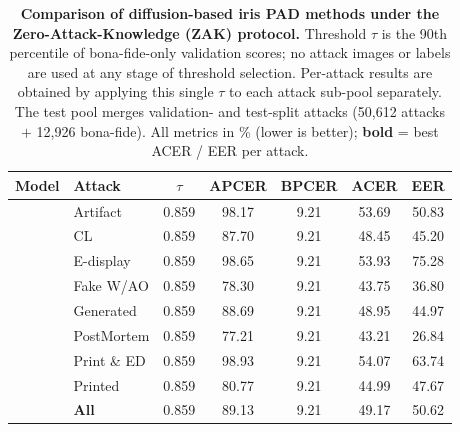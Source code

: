 \begin{table}[!htbp]
\centering
\scriptsize
\setlength{\tabcolsep}{3pt}
\label{tab:diffusion_comparison}
\caption{
\textbf{Comparison of diffusion-based iris PAD methods under the Zero-Attack-Knowledge (ZAK) protocol.}
Threshold $\tau$ is the 90th percentile of bona-fide-only validation scores; no attack images or labels are used at any stage of threshold selection.
Per-attack results are obtained by applying this single $\tau$ to each attack sub-pool separately.
The test pool merges validation- and test-split attacks (50{,}612 attacks $+$ 12{,}926 bona-fide).
All metrics in \% (lower is better); \textbf{bold} = best ACER / EER per attack.
}

\begin{tabular}{l l c c c c c}
\toprule
\textbf{Model} & \textbf{Attack} & $\tau$ & APCER & BPCER & ACER & EER \\
\midrule

& Artifact       & 0.859 &  98.17 &   9.21 &                53.69 &          50.83 \\
& CL             & 0.859 &  87.70 &   9.21 &                48.45 &          45.20 \\
& E-display      & 0.859 &  98.65 &   9.21 &                53.93 &          75.28 \\
& Fake W/AO      & 0.859 &  78.30 &   9.21 &                43.75 &          36.80 \\
& Generated      & 0.859 &  88.69 &   9.21 &                48.95 &          44.97 \\
& PostMortem     & 0.859 &  77.21 &   9.21 &                43.21 &          26.84 \\
& Print \& ED    & 0.859 &  98.93 &   9.21 &                54.07 &          63.74 \\
& Printed        & 0.859 &  80.77 &   9.21 &                44.99 &          47.67 \\
& \textbf{All}  & 0.859 &  89.13 &   9.21 &                49.17 &          50.62 \\

\midrule


\end{tabular}
\end{table}
